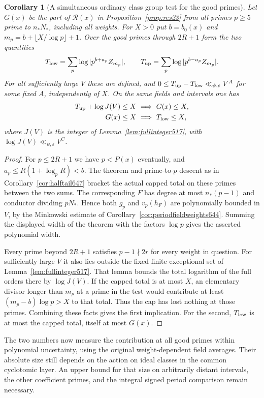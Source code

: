 \documentclass[a4paper,11pt]{article}
\newtheorem{corollary}[proposition]{Corollary}
\theoremstyle{definition}
\theoremstyle{remark}
\numberwithin{equation}{section}
\begin{document}
\begin{corollary}[A simultaneous ordinary class group test for the good primes]
\leavevmode\label{cor:goodtest648}
Let \(G(x)\) be the part of \(\mathcal R(x)\) in
Proposition~\ref{prop:res23} from all primes \(p\ge5\)
prime to \(n_*N_*\), including all weights. For \(X>0\)
put \(b=b_0(x)\) and \(m_p=b+\lfloor X/\log p\rfloor+1\).
Over the good primes through \(2R+1\) form the two quantities
\[
 T_{\rm low}=\sum_p\log|p^{b+a_p}Z_{m_p}|,\qquad
 T_{\rm up}=\sum_p\log|p^{b-a_p}Z_{m_p}|.
\]
For all sufficiently large \(V\) these are defined, and
\(0\le T_{\rm up}-T_{\rm low}\ll_{\psi,\varepsilon}V^A\)
for some fixed \(A\), independently of \(X\).
On the same fields and intervals one has
\[
 \begin{split}
 T_{\rm up}+\log J(V)\le X &\ \Longrightarrow\ G(x)\le X,\\
 G(x)\le X &\ \Longrightarrow\ T_{\rm low}\le X ,
 \end{split}
\]
where \(J(V)\) is the integer of Lemma~\ref{lem:fullinteger517},
with \(\log J(V)\ll_{\psi,\varepsilon}V^C\).
\end{corollary}
\begin{proof}
For \(p\le2R+1\) we have \(p<P(x)\) eventually, and
\(a_p\le R(1+\log_p R)<b\). The theorem and prime-to-\(p\)
descent as in Corollary~\ref{cor:halftail647} bracket the
actual capped total on these primes between the two sums.
The corresponding \(F\) has degree at most \(n_*(p-1)\)
and conductor dividing \(pN_*\). Hence both \(g_p\) and
\(v_p(h_F)\) are polynomially bounded in \(V\), by the
Minkowski estimate of Corollary~\ref{cor:periodfieldweights644}.
Summing the displayed width of the theorem with the factors
\(\log p\) gives the asserted polynomial width.

Every prime beyond \(2R+1\) satisfies \(p-1\nmid2r\) for
every weight in question. For sufficiently large \(V\) it
also lies outside the fixed finite exceptional set of
Lemma~\ref{lem:fullinteger517}. That lemma bounds the total
logarithm of the full orders there by \(\log J(V)\).
If the capped total is at most \(X\), an elementary divisor
longer than \(m_p\) at a prime in the test would contribute
at least \((m_p-b)\log p>X\) to that total. Thus the cap
has lost nothing at those primes. Combining these facts
gives the first implication. For the second, \(T_{\rm low}\)
is at most the capped total, itself at most \(G(x)\).
\end{proof}

The two numbers now measure the contribution at all good
primes within polynomial uncertainty, using the original
weight-dependent field averages. Their absolute size still
depends on the action on ideal classes in the common
cyclotomic layer. An upper bound for that size on arbitrarily
distant intervals, the other coefficient primes, and the
integral signed period comparison remain necessary.
\end{document}
